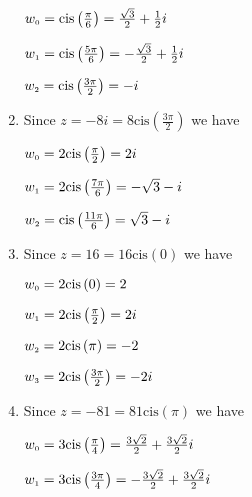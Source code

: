 \begin{enumerate}
\begin{multicols}{3}
$w_{\text{\tiny$0$}} = \text{cis}\left(\frac{\pi}{6}\right) = \frac{\sqrt{3}}{2} + \frac{1}{2}i$

$w_{\text{\tiny$1$}} = \text{cis}\left(\frac{5\pi}{6}\right) = -\frac{\sqrt{3}}{2} + \frac{1}{2}i$

$w_{\text{\tiny$2$}} = \text{cis}\left(\frac{3\pi}{2}\right) = -i$

\end{multicols}

\item Since $z = -8i = 8\text{cis}\left(\frac{3\pi}{2}\right)$ we have 

\begin{multicols}{3}

$w_{\text{\tiny$0$}} = 2\text{cis}\left(\frac{\pi}{2}\right) = 2i$

$w_{\text{\tiny$1$}} = 2\text{cis}\left(\frac{7\pi}{6}\right) = -\sqrt{3} -i$

$w_{\text{\tiny$2$}} = \text{cis}\left(\frac{11\pi}{6}\right) = \sqrt{3}-i$

\end{multicols}


\item Since $z=16 = 16\text{cis}\left(0 \right)$ we have 

\begin{multicols}{2}

$w_{\text{\tiny$0$}} =2\text{cis}\left(0\right) =2$

$w_{\text{\tiny$1$}} = 2\text{cis}\left(\frac{\pi}{2}\right) = 2i$

\end{multicols}

\begin{multicols}{2}

$w_{\text{\tiny$2$}} = 2\text{cis}\left(\pi\right) = -2$

$w_{\text{\tiny$3$}} = 2\text{cis}\left(\frac{3\pi}{2}\right) = -2i$

\end{multicols}


\item Since $z=-81 = 81\text{cis}\left(\pi \right)$ we have 

\begin{multicols}{2}

$w_{\text{\tiny$0$}} =3\text{cis}\left(\frac{\pi}{4}\right) = \frac{3\sqrt{2}}{2} + \frac{3\sqrt{2}}{2}i$

$w_{\text{\tiny$1$}} = 3\text{cis}\left(\frac{3\pi}{4}\right) =-\frac{3\sqrt{2}}{2} + \frac{3\sqrt{2}}{2}i$



\end{multicols}
\end{enumerate}
